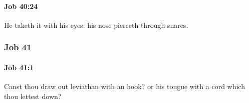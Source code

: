 		\paragraph{Job 40:24} %
			\label{JOB-40-24}

			He taketh it with his eyes: his nose pierceth through snares.

	\subsubsection{Job 41} %
		\label{JOB-41}

		\paragraph{Job 41:1} %
			\label{JOB-41-1}

			Canst thou draw out leviathan with an hook? or his tongue with a cord which thou lettest down?


